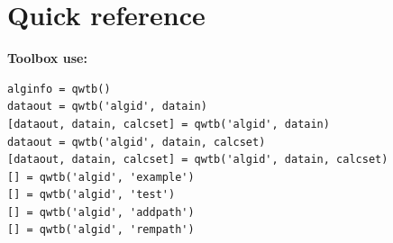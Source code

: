 \documentclass[12pt]{article} %
\begin{document}
%
\printbibliography[title={Bilbiography},heading={bibnumbered}]


\newpage
\section{Quick reference} %
{\small \textbf{Toolbox use:}\\[-1.5em]
\begin{lstlisting}[basicstyle=\small]
alginfo = qwtb()
dataout = qwtb('algid', datain)
[dataout, datain, calcset] = qwtb('algid', datain)
dataout = qwtb('algid', datain, calcset)
[dataout, datain, calcset] = qwtb('algid', datain, calcset)
[] = qwtb('algid', 'example')
[] = qwtb('algid', 'test')
[] = qwtb('algid', 'addpath')
[] = qwtb('algid', 'rempath')
\end{lstlisting}

}
\end{document}
